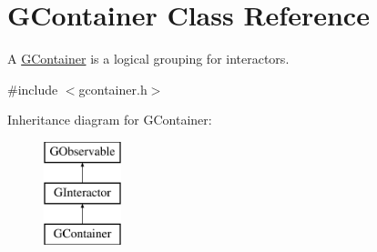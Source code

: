 \hypertarget{classGContainer}{}\section{G\+Container Class Reference}
\label{classGContainer}


A \mbox{\hyperlink{classGContainer}{G\+Container}} is a logical grouping for interactors.  




{\ttfamily \#include $<$gcontainer.\+h$>$}

Inheritance diagram for G\+Container\+:\begin{figure}[H]
\begin{center}
\leavevmode
\includegraphics[height=3.000000cm]{classGContainer}
\end{center}
\end{figure}
